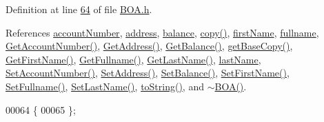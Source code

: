 Definition at line \hyperlink{_b_o_a_8h_source_l00064}{64} of file \hyperlink{_b_o_a_8h_source}{B\+O\+A.\+h}.



References \hyperlink{_b_o_a_8h_source_l00098}{account\+Number}, \hyperlink{_b_o_a_8h_source_l00100}{address}, \hyperlink{_b_o_a_8h_source_l00099}{balance}, \hyperlink{_b_o_a_8cpp_source_l00034}{copy()}, \hyperlink{_b_o_a_8h_source_l00096}{first\+Name}, \hyperlink{_b_o_a_8h_source_l00095}{fullname}, \hyperlink{_b_o_a_8cpp_source_l00080}{Get\+Account\+Number()}, \hyperlink{_b_o_a_8cpp_source_l00064}{Get\+Address()}, \hyperlink{_b_o_a_8cpp_source_l00072}{Get\+Balance()}, \hyperlink{_b_o_a_8cpp_source_l00022}{get\+Base\+Copy()}, \hyperlink{_b_o_a_8cpp_source_l00096}{Get\+First\+Name()}, \hyperlink{_b_o_a_8cpp_source_l00104}{Get\+Fullname()}, \hyperlink{_b_o_a_8cpp_source_l00088}{Get\+Last\+Name()}, \hyperlink{_b_o_a_8h_source_l00097}{last\+Name}, \hyperlink{_b_o_a_8cpp_source_l00076}{Set\+Account\+Number()}, \hyperlink{_b_o_a_8cpp_source_l00060}{Set\+Address()}, \hyperlink{_b_o_a_8cpp_source_l00068}{Set\+Balance()}, \hyperlink{_b_o_a_8cpp_source_l00092}{Set\+First\+Name()}, \hyperlink{_b_o_a_8cpp_source_l00100}{Set\+Fullname()}, \hyperlink{_b_o_a_8cpp_source_l00084}{Set\+Last\+Name()}, \hyperlink{_b_o_a_8cpp_source_l00054}{to\+String()}, and \hyperlink{_b_o_a_8cpp_source_l00015}{$\sim$\+B\+O\+A()}.


\begin{DoxyCode}
00064                                    \{
00065     \};
\end{DoxyCode}


